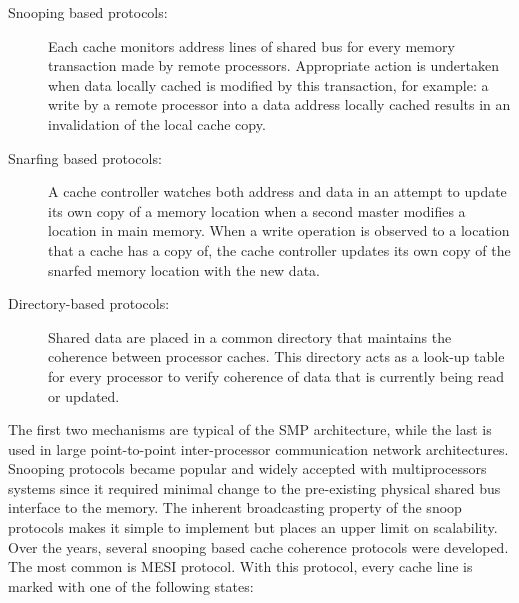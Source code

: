 \begin{description}

\item [Snooping based protocols:] Each cache monitors address lines of shared bus for every memory transaction made by remote processors. Appropriate action
is undertaken when data locally cached is modified by this transaction, for example: a write by a remote processor into a data address locally cached 
results in an invalidation of the local cache copy.

\item [Snarfing based protocols:] A cache controller watches both address and data in an attempt to update its own copy of a memory location when a second 
master modifies a location in main memory. When a write operation is observed to a location that a cache has a copy of, the cache controller updates its 
own copy of the snarfed memory location with the new data.

\item [Directory-based protocols:] Shared data are placed in a common directory that maintains the coherence between processor caches. 
This directory acts as a look-up table for every processor to verify coherence of data that is currently being read or updated.

\end{description}


The first two mechanisms are typical of the SMP architecture, while the last is used in large point-to-point inter-processor communication network 
architectures. Snooping protocols became popular and widely accepted with multiprocessors systems since it required minimal change to the pre-existing 
physical shared bus interface to the memory. The inherent broadcasting property of the snoop protocols makes it simple to implement but places an upper 
limit on scalability.
Over the years, several snooping based cache coherence protocols were developed. The most common is MESI protocol.
With this protocol, every cache line is marked with one of the following states:


